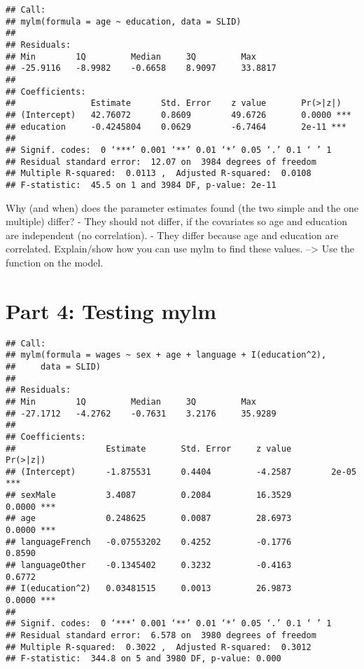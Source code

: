 \documentclass[
]{article}
\begin{document}
\begin{verbatim}
## Call:
## mylm(formula = age ~ education, data = SLID)
## 
## Residuals:
## Min        1Q         Median     3Q         Max        
## -25.9116   -8.9982    -0.6658    8.9097     33.8817    
## 
## Coefficients:
##               Estimate      Std. Error    z value       Pr(>|z|)      
## (Intercept)   42.76072      0.8609        49.6726       0.0000 ***    
## education     -0.4245804    0.0629        -6.7464       2e-11 ***     
## 
## Signif. codes:  0 ‘***’ 0.001 ‘**’ 0.01 ‘*’ 0.05 ‘.’ 0.1 ‘ ’ 1
## Residual standard error:  12.07 on  3984 degrees of freedom 
## Multiple R-squared:  0.0113 ,  Adjusted R-squared:  0.0108 
## F-statistic:  45.5 on 1 and 3984 DF, p-value: 2e-11
\end{verbatim}

Why (and when) does the parameter estimates found (the two simple and
the one multiple) differ? - They should not differ, if the covariates so
age and education are independent (no correlation). - They differ
because age and education are correlated. Explain/show how you can use
mylm to find these values. --\textgreater{} Use the function on the
model.

\hypertarget{part-4-testing-mylm}{%
\section{Part 4: Testing mylm}\label{part-4-testing-mylm}}

\begin{verbatim}
## Call:
## mylm(formula = wages ~ sex + age + language + I(education^2), 
##     data = SLID)
## 
## Residuals:
## Min        1Q         Median     3Q         Max        
## -27.1712   -4.2762    -0.7631    3.2176     35.9289    
## 
## Coefficients:
##                  Estimate       Std. Error     z value        Pr(>|z|)       
## (Intercept)      -1.875531      0.4404         -4.2587        2e-05 ***      
## sexMale          3.4087         0.2084         16.3529        0.0000 ***     
## age              0.248625       0.0087         28.6973        0.0000 ***     
## languageFrench   -0.07553202    0.4252         -0.1776        0.8590         
## languageOther    -0.1345402     0.3232         -0.4163        0.6772         
## I(education^2)   0.03481515     0.0013         26.9873        0.0000 ***     
## 
## Signif. codes:  0 ‘***’ 0.001 ‘**’ 0.01 ‘*’ 0.05 ‘.’ 0.1 ‘ ’ 1
## Residual standard error:  6.578 on  3980 degrees of freedom 
## Multiple R-squared:  0.3022 ,  Adjusted R-squared:  0.3012 
## F-statistic:  344.8 on 5 and 3980 DF, p-value: 0.000
\end{verbatim}
\end{document}
